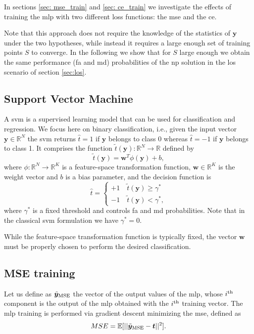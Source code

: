 \documentclass[draftcls,onecolumn,12pt]{IEEEtran}
\newcommand{\ie}{i.e., }
\begin{document}
In sections \ref{sec: mse_train} and \ref{sec: ce_train} we investigate the effects of training the \ac{mlp} with two different loss functions: the \ac{mse} and the \ac{ce}.

Note that this approach does not require the knowledge of the statistics of $\bm{y}$ under the two hypotheses, while instead it requires a large enough set of training points $S$ to converge. In the following we show that for $S$ large enough we obtain the same performance (\ac{fa} and \ac{md}) probabilities of the \ac{np} solution in the \ac{los} scenario of section \ref{sec:los}.

\subsection{Support Vector Machine}\label{sec:svm}
A \ac{svm} \cite{Bishop2006} is a supervised learning model that can be used for classification and regression. We focus here on binary classification, \ie given the input vector $\bm{y} \in \mathbb{R}^N$ the \ac{svm} returns $\hat{t} = 1$ if $\bm{y}$ belongs to class 0 whereas $\hat{t}=-1$ if $\bm{y}$ belongs to class 1. It comprises the function $\tilde{t}(\mathbf{y}): \mathbb{R}^N \to \mathbb{R}$ defined by
\begin{equation}
\label{eq:svm}
\tilde{t}(\mathbf{y}) = \mathbf{w}^T \phi (\bm{y}) + b,
\end{equation}
where $\phi: \mathbb{R}^N \to \mathbb{R}^K$ is a feature-space transformation function, $\mathbf{w} \in \mathbb{R}^K$ is the weight vector and $b$ is a bias parameter, and the decision function is
\begin{equation}
\label{eq:cases}
\hat{t} = 
\begin{cases}
+1 \quad \tilde{t}(\mathbf{y})  \geq \gamma^* \\
-1 \quad \tilde{t}(\mathbf{y})  < \gamma^*,
\end{cases}		
\end{equation} 
where $\gamma^*$ is a fixed threshold and controls \ac{fa} and \ac{md} probabilities. Note that in the classical \ac{svm} formulation we have $\gamma^* = 0$.

While the feature-space transformation function is typically fixed, the vector $\mathbf{w}$ must be properly chosen to perform the desired classification. 

\subsection{ MSE training \label{sec: mse_train}}
Let us define as $\tilde{\bm{y}}_{\rm MSE}$ the vector of the output values of the \ac{mlp}, whose $i^{\rm th}$ component is the output of the \ac{mlp} obtained with the $i^{\rm th}$ training vector. The \ac{mlp} training is performed via gradient descent minimizing the \ac{mse}, defined as
\begin{equation}
MSE = \mathbb{E}[||\tilde{\bm{y}}_{\rm MSE}-\bm{t}||^2].
\end{equation}
\end{document}
